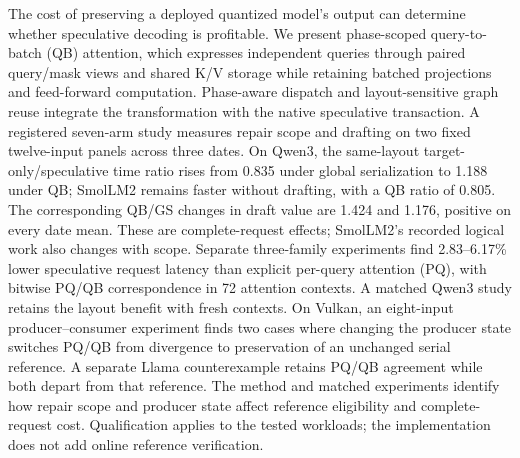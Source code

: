 The cost of preserving a deployed quantized model's output can determine whether speculative decoding is profitable. We present phase-scoped query-to-batch (QB) attention, which expresses independent queries through paired query/mask views and shared K/V storage while retaining batched projections and feed-forward computation. Phase-aware dispatch and layout-sensitive graph reuse integrate the transformation with the native speculative transaction. A registered seven-arm study measures repair scope and drafting on two fixed twelve-input panels across three dates. On Qwen3, the same-layout target-only/speculative time ratio rises from 0.835 under global serialization to 1.188 under QB; SmolLM2 remains faster without drafting, with a QB ratio of 0.805. The corresponding QB/GS changes in draft value are 1.424 and 1.176, positive on every date mean. These are complete-request effects; SmolLM2's recorded logical work also changes with scope. Separate three-family experiments find 2.83--6.17\% lower speculative request latency than explicit per-query attention (PQ), with bitwise PQ/QB correspondence in 72 attention contexts. A matched Qwen3 study retains the layout benefit with fresh contexts. On Vulkan, an eight-input producer--consumer experiment finds two cases where changing the producer state switches PQ/QB from divergence to preservation of an unchanged serial reference. A separate Llama counterexample retains PQ/QB agreement while both depart from that reference. The method and matched experiments identify how repair scope and producer state affect reference eligibility and complete-request cost. Qualification applies to the tested workloads; the implementation does not add online reference verification.
